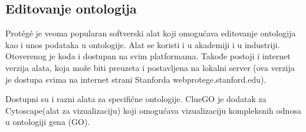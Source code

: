 \subsection{Editovanje ontologija}

Prot\'eg\'e je veoma popularan softverski alat koji omogućava editovanje ontologija kao i unos podataka u ontologije.
Alat se koristi i u akademiji i u industriji.
Otoverenog je koda i dostupan na svim platformama.
Takođe postoji i internet verzija alata, koja može biti preuzeta i postavljena na lokalni server 
(ova verzija je dostupa svima na internet strani Stanforda webprotege.stanford.edu). \par
Dostupni su i razni alata za specifične ontologije. ClueGO je dodatak za Cytoscape(alat za vizualizaciju)
 koji omogućava vizualizaciju kompleksnih odnosa u ontologiji gena (GO).